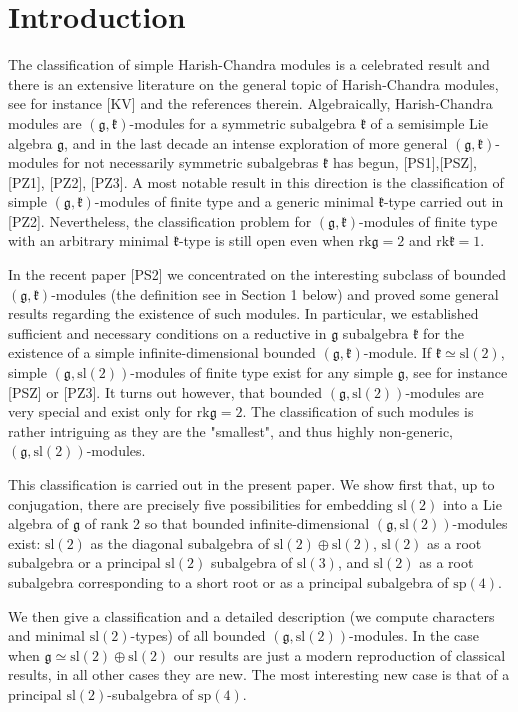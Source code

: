 \documentclass[12pt]{amsart}
\theoremstyle{plain} %
\newcommand{\rk}{\mathrm{rk }}
\renewcommand{\sl}{\mathrm{sl}}
\renewcommand{\sp}{\mathrm{sp}}
\newcommand{\kk}{\mathfrak{k}}
\renewcommand{\gg}{\mathfrak{g}}
\begin{document}
\section{Introduction}

The classification of simple Harish-Chandra modules is a celebrated result and there is an extensive literature on the general topic of Harish-Chandra modules, see for instance [KV] and the references therein. Algebraically, Harish-Chandra modules are $\left(\gg, \kk \right)$-modules for a symmetric subalgebra $\kk$ of a semisimple Lie algebra $\gg$, and in the last decade an intense exploration of more general $(\gg, \kk)$-modules for not necessarily symmetric subalgebras $\kk$ has begun, [PS1],[PSZ], [PZ1], [PZ2], [PZ3]. A most notable result in this direction is the classification of simple $(\gg, \kk)$-modules of finite type and a generic minimal $\kk$-type carried out in [PZ2]. Nevertheless, the classification problem for $(\gg, \kk)$-modules of finite type with an arbitrary minimal $\kk$-type  is still open even when $\rk \gg=2$ and $\rk\kk=1$.

In the recent paper [PS2] we concentrated on the interesting subclass of bounded $(\gg, \kk)$-modules (the definition see in Section 1 below) and proved some general results regarding the existence of such modules.  In particular, we established sufficient and necessary conditions on a reductive in $\gg$ subalgebra $\kk$ for the existence of a simple infinite-dimensional bounded $(\gg, \kk)$-module. If $\kk \simeq \sl(2)$, simple $(\gg, \sl(2))$-modules of finite type exist for any simple $\gg$, see for instance [PSZ] or [PZ3]. It turns out however, that bounded $(\gg, \sl(2))$-modules are very special and exist only for $\rk\gg=2$. The classification of such modules is rather intriguing as they are the "smallest", and thus highly non-generic, $(\gg,\sl(2))$-modules.

This classification is carried out in the present paper. We show first that, up to conjugation, there are precisely five possibilities for embedding $\sl(2)$ into a Lie algebra of $\gg$ of rank 2 so that bounded infinite-dimensional $(\gg, \sl(2))$-modules exist:
 $\sl(2)$ as the diagonal subalgebra of $\sl(2)\oplus\sl(2)$, $\sl(2)$ as a root subalgebra or a principal $\sl(2)$ subalgebra of $\sl(3)$, and $\sl(2)$ as a root subalgebra corresponding to a short root or as a principal subalgebra of $\sp(4)$. 

We then give a classification and a detailed description (we compute characters and minimal $\sl(2)$-types) of all bounded $(\gg, \sl(2))$-modules. In the case when $\gg\simeq \sl(2)\oplus\sl(2)$ our results are just a modern reproduction of classical results, in all other cases they are new. The most interesting new case is that of a principal $\sl(2)$-subalgebra of $\sp(4)$.
\end{document}

